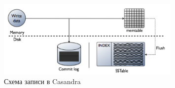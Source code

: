 \begin{figure}[h]
    \centering
    \includegraphics[width=0.8\textwidth]{assets/casandra.png}
    \caption{Схема записи в Casandra}
    \label{fig:mesh1}
\end{figure}